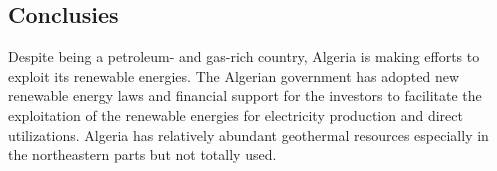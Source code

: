 \documentclass[a1,portrait]{a0poster}
\begin{document}
\begin{multicols}{3}

\color{SaddleBrown} %

\section*{Conclusies}
Despite being a petroleum- and gas-rich country, Algeria is making efforts to exploit its renewable energies. The Algerian government has adopted new renewable energy laws and financial support for the investors to facilitate the exploitation of the renewable energies for electricity production and direct utilizations. Algeria has relatively abundant geothermal resources especially in the northeastern parts but not totally used.
\color{Black} %






 
\end{multicols}
\end{document}
